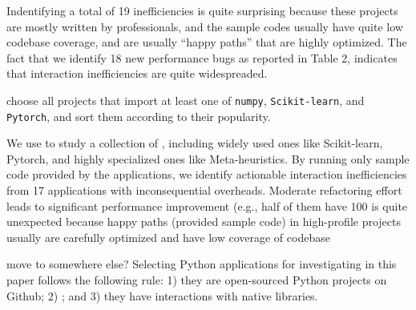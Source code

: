 Indentifying a total of 19 inefficiencies is quite
surprising because these projects are mostly written by professionals,
and the sample codes usually have quite low codebase coverage,
and are usually ``happy paths'' that are highly optimized. The fact that we identify 18 new performance bugs as reported in Table 2, 
indicates that interaction inefficiencies are quite widespreaded.












\iffalse
choose all projects that import at least one of {\tt numpy}, {\tt Scikit-learn}, and {\tt Pytorch}, and sort them according to their popularity. 
 
We use \tool to study a collection of , including widely used ones like Scikit-learn, Pytorch, and highly specialized ones like
Meta-heuristics. By running only sample code provided by the applications, we identify actionable interaction inefficiencies from 17
applications with inconsequential overheads. Moderate refactoring
effort leads to significant performance improvement (e.g., half of
them have 100%
is quite unexpected because happy paths (provided sample code) in
high-profile projects usually are carefully optimized and have low
coverage of codebase

{\color{blue} move to somewhere else?}
Selecting Python applications for investigating in this paper follows the following rule: 1) they are open-sourced Python projects on Github; 2) ; and 3) they have interactions with native libraries. 

